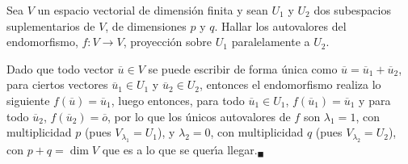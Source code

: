 \begin{enunciado}
 Sea $V$ un espacio vectorial de dimensi\'on finita y sean $U_1$ y $U_2$ dos subespacios suplementarios de $V$, de dimensiones $p$ y $q$. Hallar los autovalores del endomorfismo, $f:V \rightarrow V$, proyecci\'on sobre $U_1$ paralelamente a $U_2$.
\end{enunciado}

\begin{solucion}
 Dado que todo vector $\overline{u} \in V$ se puede escribir de forma \'unica como $\overline{u} = \overline{u}_1 + \overline{u}_2$, para ciertos vectores $\overline{u}_1 \in U_1$ y $\overline{u}_2 \in U_2$, entonces el endomorfismo realiza lo siguiente $f(\overline{u}) = \overline{u}_1$, luego entonces, para todo $\overline{u}_1 \in U_1$, $f(\overline{u}_1) = \overline{u}_1$ y para  todo $\overline{u}_2$, $f(\overline{u}_2) = \overline{o}$, por lo que los \'unicos autovalores de $f$ son $\lambda_1 = 1$, con multiplicidad $p$ (pues $V_{\lambda_1} = U_1$), y $\lambda_2 = 0$, con multiplicidad $q$ (pues $V_{\lambda_2} = U_2$), con $p+q=\dim V$ que es a lo que se quer\'{\i}a llegar.${}_{\blacksquare}$
\end{solucion}

